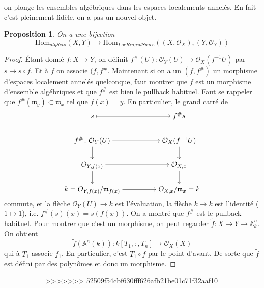 \documentclass[a4paper,12pt]{book}
\newcommand{\A}{\mathbb{A}}
\newcommand{\Or}{\mathcal{O}}
\newcommand{\Hom}{\textrm{Hom}}
\newcommand{\m}{\mathfrak{m}}
\theoremstyle{plain}
\newtheorem{prop}[subsection]{Proposition}
\theoremstyle{definition}
\theoremstyle{remark}
\begin{document}
on plonge les ensembles algébriques dans les espaces localements
annelés. En fait c'est pleinement fidèle, on a pas un nouvel objet.
\begin{prop}
    On a une bijection 
    \[\Hom_{algSets}(X,Y)\to \Hom_{LocRingedSpace}((X,\Or_X),(Y,\Or_Y))\]
\end{prop}
\begin{proof}
    Étant donné $f\colon X\to Y$, on définit 
    $f^{\#}(U)\colon \Or_Y(U)\to \Or_X(f^{-1}U)$ par $s\mapsto s\circ f$.
    Et à $f$ on associe $(f,f^{\#}$. Maintenant si on a un $(f,f^{\#})$
    un morphisme d'espaces localement annelés quelconque, faut montrer
    que $f$ est un morphisme d'ensemble 
    algébriques et que $f^{\#}$ est bien le pullback habituel. Faut
    se rappeler que $f^{\#}(\m_y)\subset \m_x$ tel que $f(x)=y$. En 
    particulier, le grand carré de 
\[\begin{tikzcd}[ampersand replacement=\&,cramped]
	s \&\& {f^{\#}s} \\
	{f^{\#}\colon\mathcal O_Y(U)} \&\& {\mathcal O_X(f^{-1}U)} \\
	{O_{Y,f(x)}} \&\& {\mathcal O_{X,x}} \\
	{k=O_{Y,f(x)}/\mathfrak m_{f(x)}} \&\& {O_{X,x}/\mathfrak m_{x}=k}
	\arrow[maps to, from=1-1, to=1-3]
	\arrow[from=2-1, to=2-3]
	\arrow[from=2-1, to=3-1]
	\arrow[from=2-3, to=3-3]
	\arrow[from=3-1, to=3-3]
	\arrow[from=3-1, to=4-1]
	\arrow[from=3-3, to=4-3]
	\arrow[from=4-1, to=4-3]
\end{tikzcd}\]
    commute, et la flèche $\Or_Y(U)\to k$ est l'évaluation, la flèche
    $k\to k$ est l'identité ($1\mapsto 1$), i.e. $f^{\#}(s)(x)=s(f(x))$.
    On a montré que $f^{\#}$ est le pullback habituel. Pour montrer
    que c'est un morphisme, on peut regarder 
    $\tilde f\colon X\to Y\to \A^n_k$. On obtient 
    \[\tilde f(\A^n(k))\colon k[T_1,\colon, T_n]\to \Or_X(X)\]
    qui à $T_1$ associe $f_1$. En particulier, c'est $T_1\circ f$ par
    le point d'avant. De sorte que $\tilde f$ est défini par
    des polynômes et donc un morphisme.

\end{proof}
=======
>>>>>>> 52509f54cbf630fff626afb21be01c71f32aaf10

\printbibliography
\end{document}
